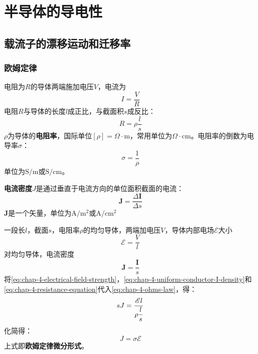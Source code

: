 \chapter{半导体的导电性}

\section{载流子的漂移运动和迁移率}

\subsection{欧姆定律}

电阻为$R$的导体两端施加电压$V$，电流为
\begin{equation}
    I=\frac{V}{R}\label{eq:chap-4-ohms-law}
\end{equation}
电阻$R$与导体的长度$l$成正比，与截面积$s$成反比：
\begin{equation}
    R=\rho\frac{l}{s}\label{eq:chap-4-resistance-equation}
\end{equation}
$\rho$为导体的\textbf{电阻率}，国际单位$[\rho]=\Omega\cdot\mathrm{m}$，常用单位为$\Omega\cdot\mathrm{cm}$。电阻率的倒数为电导率$\sigma$：
\begin{equation}
    \sigma=\frac{1}{\rho}\label{eq:chap-4-sigma-rho-relation}
\end{equation}
单位为$\mathrm{S}/\mathrm{m}$或$\mathrm{S}/\mathrm{cm}$。

\textbf{电流密度}$J$是通过垂直于电流方向的单位面积截面的电流：
\begin{equation}
    \bm J=\frac{\Delta \bm I}{\Delta s}
\end{equation}
$\bm J$是一个矢量，单位为$\mathrm{A/m^2}$或$\mathrm{A/cm^2}$

一段长$l$，截面$s$，电阻率$\rho$的均匀导体，两端加电压$V$，导体内部电场$\mathscr{E}$大小
\begin{equation}
    \mathscr{E}=\frac{V}{l}\label{eq:chap-4-electrical-field-strength}
\end{equation}
对均匀导体，电流密度
\begin{equation}
    \bm J=\frac{\bm I}{s}\label{eq:chap-4-uniform-conductor-I-density}
\end{equation}
将\autoref{eq:chap-4-electrical-field-strength}，\autoref{eq:chap-4-uniform-conductor-I-density}和\autoref{eq:chap-4-resistance-equation}代入\autoref{eq:chap-4-ohms-law}，得：
\begin{equation}
    sJ=\frac{\mathscr{E}l}{\displaystyle \rho\frac{l}{s}}
\end{equation}
化简得：
\begin{equation}
    J=\sigma\mathscr{E}\label{eq:chap-4-ohms-law-differential-form}
\end{equation}
上式即\textbf{欧姆定律微分形式}。

